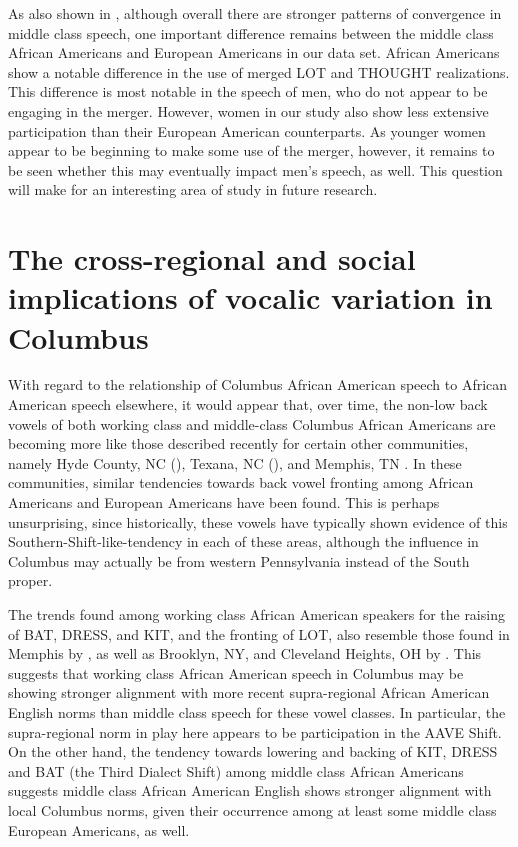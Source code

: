 \documentclass[output=paper,colorlinks,citecolor=brown]{langscibook}
\begin{document}
As also shown in , although overall there are stronger patterns of convergence in middle class speech, one important difference remains between the middle class African Americans and European Americans in our data set. African Americans show a notable difference in the use of merged LOT and THOUGHT realizations. This difference is most notable in the speech of men, who do not appear to be engaging in the merger. However, women in our study also show less extensive participation than their European American counterparts. As younger women appear to be beginning to make some use of the merger, however, it remains to be seen whether this may eventually impact men's speech, as well. This question will make for an interesting area of study in future research.


\section{The cross-regional and social implications of vocalic variation in Columbus}
With regard to the relationship of Columbus African American speech to African American speech elsewhere, it would appear that, over time, the non-low back vowels of both working class and middle-class Columbus African Americans are becoming more like those described recently for certain other communities, namely Hyde County, NC (\citealt{WolframThomas2002}), Texana, NC (\citealt{childscarpenter2010}), and Memphis, TN \citep{fridland2003network,FridlandBartlett2006}. In these communities, similar tendencies towards back vowel fronting among African Americans and European Americans have been found. This is perhaps unsurprising, since historically, these vowels have typically shown evidence of this Southern-Shift-like-tendency in each of these areas, although the influence in Columbus may actually be from western Pennsylvania instead of the South proper.

The trends found among working class African American speakers for the raising of BAT, DRESS, and KIT, and the fronting of LOT, also resemble those found in Memphis by  \citet{FridlandBartlett2006}, as well as Brooklyn, NY, and Cleveland Heights, OH by \citet{Thomas2007phonological}.  This suggests that working class African American speech in Columbus may be showing stronger alignment with more recent supra-regional African American English norms than middle class speech for these vowel classes. In particular, the supra-regional norm in play here appears to be participation in the AAVE Shift.  On the other hand, the tendency towards lowering and backing of KIT, DRESS and BAT (the Third Dialect Shift) among middle class African Americans suggests middle class African American English shows stronger alignment with local Columbus norms, given their occurrence among at least some middle class European Americans, as well.
\end{document}
